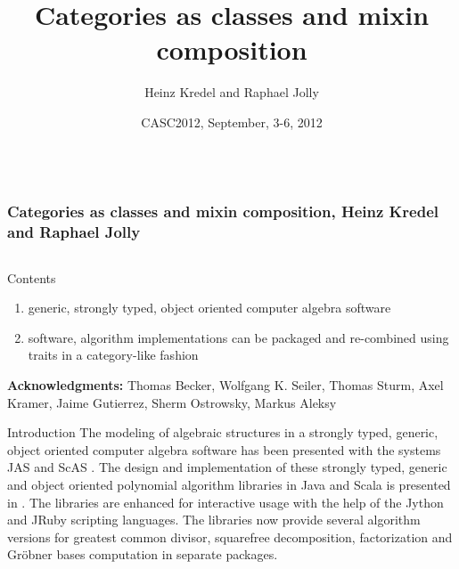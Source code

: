 \documentclass[final]{beamer}
\title[Categories and Mixins]{Categories as classes and mixin composition}
\author[Kredel \& Jolly]{Heinz Kredel\inst{1} and Raphael Jolly\inst{2}}
\institute{IT-Center, University of Mannheim, Germany %
\and Databeans, Paris, France%
}
\date{CASC2012, September, 3-6, 2012}
\begin{document}

\begin{frame}[fragile] 
\frametitle{\mbox{ }\\ \hspace{13cm}Categories as classes and mixin composition, Heinz Kredel and Raphael Jolly}
\begin{columns}[t]

\begin{column}{.3\linewidth}

  \begin{block}{\large Contents}
  \normalsize 
  \begin{enumerate}
  \item generic, strongly typed, object oriented computer algebra software
  \item software, algorithm implementations can be packaged and
    re-combined using traits in a category-like fashion
  \end{enumerate}
\tiny
{\scriptsize \textbf{Acknowledgments:}}
Thomas Becker, Wolfgang K. Seiler, Thomas Sturm, Axel Kramer, 
Jaime Gutierrez, Sherm Ostrowsky, Markus Aleksy
  \end{block}
  \hfill
  \begin{block}{\large Introduction}
\scriptsize
The modeling of algebraic structures in a strongly typed, generic,
object oriented computer algebra software has been presented with the
systems JAS \cite{Kredel:2000,Kredel:2008} and ScAS \cite{Jolly:2010}.
The design and implementation of these strongly typed, generic and
object oriented polynomial algorithm libraries in Java and Scala is
presented in \cite{JollyKredel:2010}.
The libraries are enhanced for interactive usage with the help of
the Jython and JRuby scripting languages. The libraries now
provide several algorithm versions for greatest common divisor,
squarefree decomposition, factorization and Gr\"obner bases
computation in separate packages.


\end{block}
\end{column}
\end{columns}
\end{frame}
\end{document}
